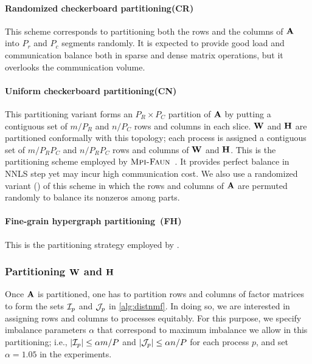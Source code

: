 \paragraph{Randomized checkerboard partitioning(\textbf{CR})}
This scheme corresponds to partitioning both the rows and the columns of $\mathbf{A}$ into $P_r$ and $P_c$ segments randomly.
It is expected to provide good load and communication balance both in sparse and dense matrix operations, but it overlooks the communication volume.

\paragraph{Uniform checkerboard partitioning(\textbf{CN})}
This partitioning variant forms an $P_R \times P_C$ partition of $\mathbf{A}$ by putting a contiguous set of $m / P_R$ and $n / P_C$ rows and columns in each slice.
$\mathbf{W}$ and $\mathbf{H}$ are partitioned conformally with this topology; each process is assigned a contiguous set of  $m / P_R P_C$ and $n / P_R P_C$ rows and columns of $\mathbf{W}$ and $\mathbf{H}$.
This is the partitioning scheme employed by $\textsc{Mpi-Faun}$~\cite{KBP16, KBP16MPIFAUN}.
It provides perfect balance in NNLS step yet may incur high communication cost.
We also use a randomized variant (\urp) of this scheme in which the rows and columns of $\mathbf{A}$ are permuted randomly to balance its nonzeros among parts.

\paragraph{Fine-grain hypergraph partitioning~(\textbf{FH})}
This is the partitioning strategy employed by \hypertensor.


\subsubsection{Partitioning $\mathbf{W}$ and $\mathbf{H}$}
Once $\mathbf{A}$ is partitioned, one has to partition rows and columns of factor matrices to form the sets $\mathcal{I}_p$ and $\mathcal{J}_p$ in \cref{alg:distnmf}.
In doing so, we are interested in assigning rows and columns to processes equitably.
For this purpose, we specify imbalance parameters $\alpha$ that correspond to maximum imbalance we allow in this partitioning; i.e., $|\mathcal{I}_p| \le \alpha m / P$ and $|\mathcal{J}_p| \le \alpha n / P$ for each process $p$, and set $\alpha = 1.05$ in the experiments.

